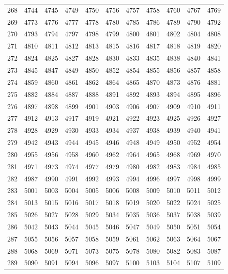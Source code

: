 \begin{longtable}{|r|rrrrrrrrrr|}
  268 & 4744 & 4745 & 4749 & 4750 & 4756 & 4757 & 4758 & 4760 & 4767 & 4769 \\ 
  269 & 4773 & 4776 & 4777 & 4778 & 4780 & 4785 & 4786 & 4789 & 4790 & 4792 \\ 
  270 & 4793 & 4794 & 4797 & 4798 & 4799 & 4800 & 4801 & 4802 & 4804 & 4808 \\ 
  271 & 4810 & 4811 & 4812 & 4813 & 4815 & 4816 & 4817 & 4818 & 4819 & 4820 \\ 
  272 & 4824 & 4825 & 4827 & 4828 & 4830 & 4833 & 4835 & 4838 & 4840 & 4841 \\ 
  273 & 4845 & 4847 & 4849 & 4850 & 4852 & 4854 & 4855 & 4856 & 4857 & 4858 \\ 
  274 & 4859 & 4860 & 4861 & 4862 & 4864 & 4865 & 4870 & 4873 & 4876 & 4881 \\ 
  275 & 4882 & 4884 & 4887 & 4888 & 4891 & 4892 & 4893 & 4894 & 4895 & 4896 \\ 
  276 & 4897 & 4898 & 4899 & 4901 & 4903 & 4906 & 4907 & 4909 & 4910 & 4911 \\ 
  277 & 4912 & 4913 & 4917 & 4919 & 4921 & 4922 & 4923 & 4925 & 4926 & 4927 \\ 
  278 & 4928 & 4929 & 4930 & 4933 & 4934 & 4937 & 4938 & 4939 & 4940 & 4941 \\ 
  279 & 4942 & 4943 & 4944 & 4945 & 4946 & 4948 & 4949 & 4950 & 4952 & 4954 \\ 
  280 & 4955 & 4956 & 4958 & 4960 & 4962 & 4964 & 4965 & 4968 & 4969 & 4970 \\ 
  281 & 4971 & 4973 & 4974 & 4977 & 4979 & 4980 & 4982 & 4983 & 4984 & 4985 \\ 
  282 & 4987 & 4990 & 4991 & 4992 & 4993 & 4994 & 4996 & 4997 & 4998 & 4999 \\ 
  283 & 5001 & 5003 & 5004 & 5005 & 5006 & 5008 & 5009 & 5010 & 5011 & 5012 \\ 
  284 & 5013 & 5015 & 5016 & 5017 & 5018 & 5019 & 5020 & 5022 & 5024 & 5025 \\ 
  285 & 5026 & 5027 & 5028 & 5029 & 5034 & 5035 & 5036 & 5037 & 5038 & 5039 \\ 
  286 & 5042 & 5043 & 5044 & 5045 & 5046 & 5047 & 5049 & 5050 & 5051 & 5054 \\ 
  287 & 5055 & 5056 & 5057 & 5058 & 5059 & 5061 & 5062 & 5063 & 5064 & 5067 \\ 
  288 & 5068 & 5069 & 5071 & 5073 & 5075 & 5078 & 5080 & 5082 & 5083 & 5087 \\ 
  289 & 5090 & 5091 & 5094 & 5096 & 5097 & 5100 & 5103 & 5104 & 5107 & 5109 \\ 

\end{longtable}
